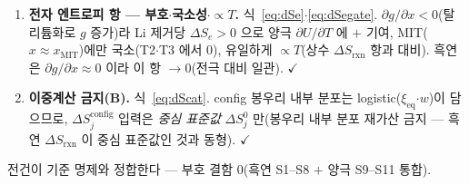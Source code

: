 \documentclass[11pt,a4paper]{article}
\newcommand{\eq}{\mathrm{eq}}
\newcommand{\rxn}{\mathrm{rxn}}
\newcommand{\config}{\mathrm{config}}
\newcommand{\MIT}{\mathrm{MIT}}
\begin{document}
\begin{enumerate}[label=\textbf{S\arabic*.},leftmargin=2.6em,itemsep=2pt]
방전 규약(식~\eqref{eq:xieq})도 양극에서 동일. $\checkmark$
\item \textbf{전자 엔트로피 항 — 부호$\cdot$국소성$\cdot$$\propto T$.} 식~\eqref{eq:dSe}$\cdot$\eqref{eq:dSegate}.
$\partial g/\partial x<0$(탈리튬화로 $g$ 증가)라 Li 제거당 $\Delta S_e>0$ 으로 양극 $\partial U/\partial T$ 에 $+$ 기여,
MIT($x\approx x_\MIT$)에만 국소(T2$\cdot$T3 에서 $0$), 유일하게 $\propto T$(상수 $\Delta S_\rxn$ 항과 대비). 흑연은
$\partial g/\partial x\!\approx\!0$ 이라 이 항 $\to0$(전극 대비 일관). $\checkmark$
\item \textbf{이중계산 금지(B).} 식~\eqref{eq:dScat}. config 봉우리 내부 분포는 logistic($\xi_\eq$$\cdot$$w$)이 담으므로,
$\Delta S^\config_j$ 입력은 \emph{중심 표준값} $\Delta S^0_j$ 만(봉우리 내부 분포 재가산 금지 — 흑연 $\Delta S_\rxn$ 이
중심 표준값인 것과 동형). $\checkmark$
\end{enumerate}
전건이 기준 명제와 정합한다 — 부호 결함 $0$(흑연 S1--S8 $+$ 양극 S9--S11 통합).
\end{document}
